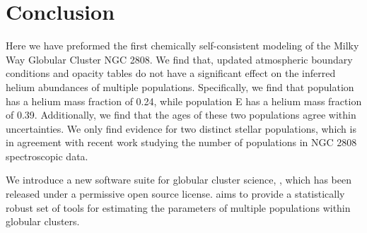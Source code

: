 \section{Conclusion}\label{sec:2808conclusion}
Here we have preformed the first chemically self-consistent modeling of the
Milky Way Globular Cluster NGC 2808. We find that, updated atmospheric boundary
conditions and opacity tables do not have a significant effect on the inferred
helium abundances of multiple populations. Specifically, we find that
population  has a helium mass fraction of 0.24, while population E has a helium
mass fraction of 0.39. Additionally, we find that the ages of these two populations 
agree within uncertainties. We only find evidence for two distinct stellar
populations, which is in agreement with recent work studying the number
of populations in NGC 2808 spectroscopic data.

We introduce a new software suite for globular cluster science,
\fidanka, which has been released under a permissive open source license.
\fidanka aims to provide a statistically robust set of tools for estimating the
parameters of multiple populations within globular clusters.
